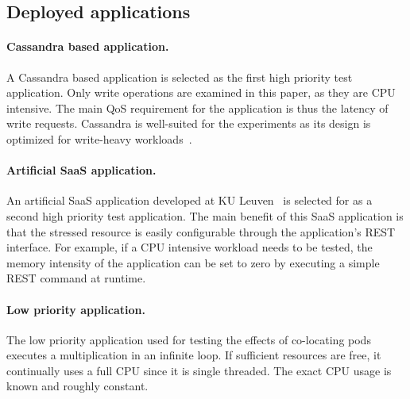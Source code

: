 \subsection{Deployed applications}
\label{test-apps}

\paragraph{Cassandra based application.}
A Cassandra based application is selected as the first high priority test application. Only write operations are examined in this paper, as they are CPU intensive. The main QoS requirement for the application is thus the latency of write requests. Cassandra is well-suited for the experiments as its design is optimized for write-heavy workloads~\citep{scalar}.

\paragraph{Artificial SaaS application.}
\label{setup:saas-app}
An artificial SaaS application developed at KU Leuven~\citep{saas-app} is selected for as a second high priority test application. The main benefit of this SaaS application is that the stressed resource is easily configurable through the application's REST interface. For example, if a CPU intensive workload needs to be tested, the memory intensity of the application can be set to zero by executing a simple REST command at runtime. 

\paragraph{Low priority application.}
\label{setup:lpp}
The low priority application used for testing the effects of co-locating pods executes a multiplication in an infinite loop. If sufficient resources are free, it continually uses a full CPU since it is single threaded. The exact CPU usage is known and roughly constant.
